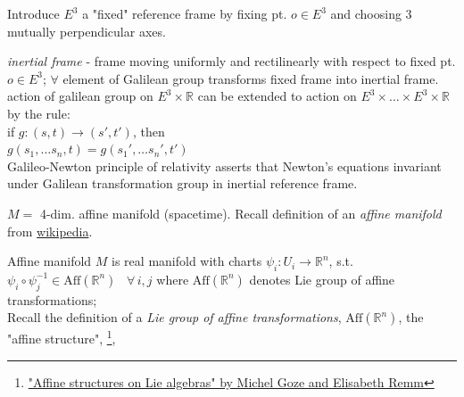 Introduce $E^3$ a "fixed" reference frame by fixing pt. $o \in E^3$ and choosing 3 mutually perpendicular axes.

\emph{inertial frame} - frame moving uniformly and rectilinearly with respect to fixed pt. $o \in E^3$; $\forall $ element of Galilean group transforms fixed frame into inertial frame. \\

action of galilean group on $E^3 \times \mathbb{R}$ can be extended to action on $E^3 \times \dots \times E^3 \times \mathbb{R}$ by the rule: \\
if $g: (s,t) \to (s',t')$, then \\
\phantom{if} $g(s_1, \dots s_n, t) = g(s_1' , \dots s_n', t')$ \\

Galileo-Newton principle of relativity asserts that Newton's equations invariant under Galilean transformation group in inertial reference frame.

$M = $ 4-dim. affine manifold (spacetime). Recall definition of an \emph{affine manifold} from \href{https://en.wikipedia.org/wiki/Affine_manifold}{wikipedia}.

Affine manifold $M$ is real manifold with charts $\psi_i : U_i \to \mathbb{R}^n$, s.t. $\psi_i \circ \psi_j^{-1} \in \text{Aff}(\mathbb{R}^n)$ \, $\forall \, i ,j$ where $\text{Aff}{(\mathbb{R}^n)}$ denotes Lie group of affine transformations; \\

Recall the definition of a \emph{Lie group of affine transformations}, $\text{Aff}{(\mathbb{R}^n)}$, the "affine structure", \footnote{\href{http://citeseerx.ist.psu.edu/viewdoc/download?doi=10.1.1.627.5443&rep=rep1&type=pdf}{"Affine structures on Lie algebras" by Michel Goze and Elisabeth Remm}},

